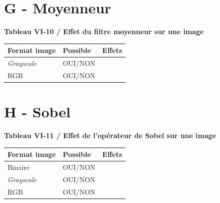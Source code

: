 \section{G - Moyenneur}


\textbf{Tableau VI-10 / Effet du filtre moyenneur sur une image}
\vspace{-0.3cm}

\begin{center}
\begin{tabular}{|>{\arraybackslash}p{3cm}|>{\centering\arraybackslash}p{3cm}|>{\centering\arraybackslash}p{10cm}|}
  \hline
  Format image & Possible & Effets \\
  \hline
  \textit{Grayscale} & OUI/NON & \rule{0pt}{3em} \\
  \hline
  RGB & OUI/NON & \rule{0pt}{2em} \\
  \hline
\end{tabular}
\end{center}


\noindent
{} 


\section{H - Sobel}

\textbf{Tableau VI-11 / Effet de l'opérateur de Sobel sur une image}
\vspace{-0.3cm}

\begin{center}
\begin{tabular}{|>{\arraybackslash}p{3cm}|>{\centering\arraybackslash}p{3cm}|>{\centering\arraybackslash}p{10cm}|}
  \hline
  Format image & Possible & Effets \\
  \hline
  Binaire & OUI/NON & \rule{0pt}{3em} \\
  \hline
  \textit{Grayscale} & OUI/NON & \rule{0pt}{2em} \\
  \hline
  RGB & OUI/NON & \rule{0pt}{2em} \\
  \hline
\end{tabular}
\end{center}

